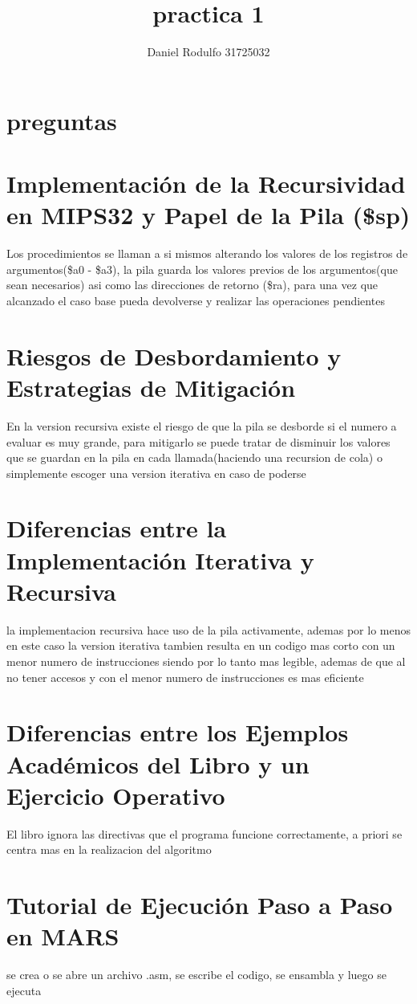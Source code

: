 \documentclass{article}
\title{practica 1}
\author{Daniel Rodulfo 31725032}
\begin{document}
\maketitle

\section{preguntas}

\section{Implementación de la Recursividad en MIPS32 y Papel de la Pila (\$sp)}
Los procedimientos se llaman a si mismos alterando los valores de los registros de argumentos(\$a0 - \$a3), la pila guarda los valores previos de los argumentos(que sean necesarios) asi como las direcciones de retorno (\$ra), para una vez que alcanzado el caso base pueda devolverse y realizar las operaciones pendientes

\section{Riesgos de Desbordamiento y Estrategias de Mitigación}
En la version recursiva existe el riesgo de que la pila se desborde si el numero a evaluar es muy grande, para mitigarlo se puede tratar de disminuir los valores que se guardan en la pila en cada llamada(haciendo una recursion de cola) o simplemente escoger una version iterativa en caso de poderse

\section{Diferencias entre la Implementación Iterativa y Recursiva}
 la implementacion recursiva hace uso de la pila activamente, ademas por lo menos en este caso la version iterativa tambien resulta en un codigo mas corto con un menor numero de instrucciones siendo por lo tanto mas legible, ademas de que al no tener accesos y con el menor numero de instrucciones es mas eficiente

\section{Diferencias entre los Ejemplos Académicos del Libro y un Ejercicio Operativo}
El libro ignora las directivas que el programa funcione correctamente, a priori se centra mas en la realizacion del algoritmo

\section{Tutorial de Ejecución Paso a Paso en MARS}
se crea o se abre un archivo .asm, se escribe el codigo, se ensambla y luego se ejecuta
\end{document}
